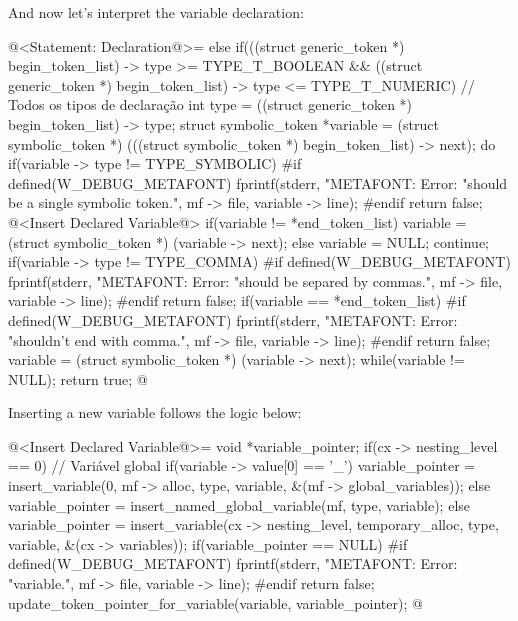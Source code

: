 And now let's interpret the variable declaration:

\iniciocodigo
@<Statement: Declaration@>=
else if(((struct generic_token *) begin_token_list) -> type >=
        TYPE_T_BOOLEAN &&
        ((struct generic_token *) begin_token_list) -> type <=
        TYPE_T_NUMERIC){ // Todos os tipos de declaração
  int type = ((struct generic_token *) begin_token_list) -> type;
  struct symbolic_token *variable = (struct symbolic_token *)
           (((struct symbolic_token *) begin_token_list) -> next);
  do{
    if(variable -> type != TYPE_SYMBOLIC){
#if defined(W_DEBUG_METAFONT)
      fprintf(stderr, "METAFONT: Error: %
                    "should be a single symbolic token.\n", mf -> file,
                    variable -> line);
#endif
      return false;
    }
    @<Insert Declared Variable@>
    if(variable != *end_token_list)
      variable = (struct symbolic_token *) (variable -> next);
    else{
      variable = NULL;
      continue;
    }
    if(variable -> type != TYPE_COMMA){
#if defined(W_DEBUG_METAFONT)
      fprintf(stderr, "METAFONT: Error: %
                    "should be separed by commas.\n", mf -> file,
                    variable -> line);
#endif
      return false;
    }
    if(variable == *end_token_list){
#if defined(W_DEBUG_METAFONT)
      fprintf(stderr, "METAFONT: Error: %
                    "shouldn't end with comma.\n", mf -> file,
                    variable -> line);
#endif
      return false;
    }
    variable = (struct symbolic_token *) (variable -> next);
  } while(variable != NULL);
  return true;
}
@
\fimcodigo

Inserting a new variable follows the logic below:

\iniciocodigo
@<Insert Declared Variable@>=
{
  void *variable_pointer;
  if(cx -> nesting_level == 0){ // Variável global
    if(variable -> value[0] == '_')
      variable_pointer = insert_variable(0, mf -> alloc, type, variable,
                                         &(mf -> global_variables));
    else
      variable_pointer = insert_named_global_variable(mf, type, variable);
  }
  else
    variable_pointer = insert_variable(cx -> nesting_level,
                                      temporary_alloc, type,
                                      variable, &(cx -> variables));
  if(variable_pointer == NULL){
#if defined(W_DEBUG_METAFONT)
      fprintf(stderr, "METAFONT: Error: %
                    "variable.\n", mf -> file, variable -> line);
#endif
    return false;
  }
  update_token_pointer_for_variable(variable, variable_pointer);
}
@
\fimcodigo

